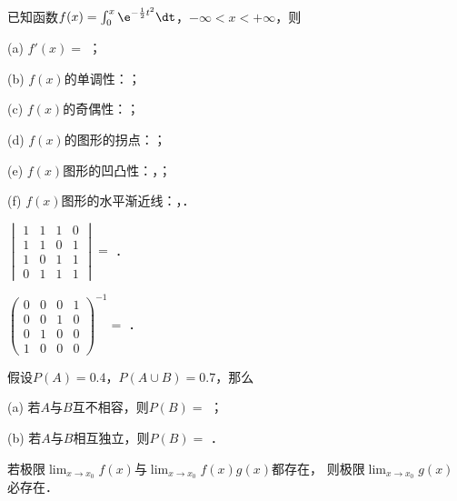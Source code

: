 \documentclass[plain,noanswer,medmath]{../../template/jnuexam}
\begin{document}




\begin{problem}
已知函数$f(x)=\int_0^x\e^{-\frac{1}{2}t^2}\dt$，$-\infty<x<+\infty$，则\par
(a) $f'(x)=$ \fillin{}；\par
(b) $f(x)$的单调性：\fillin{}；\par
(c) $f(x)$的奇偶性：\fillin{}；\par
(d) $f(x)$的图形的拐点：\fillin{}；\par
(e) $f(x)$图形的凹凸性：\fillin{}，\fillin{}；\par
(f) $f(x)$图形的水平渐近线：\fillin{}，\fillin{}．
\end{problem}


\begin{problem}
$\begin{vmatrix}
  1 & 1 & 1 & 0 \\
  1 & 1 & 0 & 1 \\
  1 & 0 & 1 & 1 \\
  0 & 1 & 1 & 1
\end{vmatrix}=$ \fillin{}．
\end{problem}


\begin{problem}
$\begin{pmatrix}
  0 & 0 & 0 & 1 \\
  0 & 0 & 1 & 0 \\
  0 & 1 & 0 & 0 \\
  1 & 0 & 0 & 0
\end{pmatrix}^{-1}=$ \fillin{}．
\end{problem}


\begin{problem}
假设$P(A)=0.4$，$P(A\cup B)=0.7$，那么\par
(a) 若$A$与$B$互不相容，则$P(B)=$ \fillin{}；\par
(b) 若$A$与$B$相互独立，则$P(B)=$ \fillin{}．
\end{problem}



\begin{problem}
若极限$\lim_{x \to x_0} f(x)$与$\lim_{x \to x_0} f(x)g(x)$都存在，
则极限$\lim_{x \to x_0} g(x)$必存在．\tickout{}
\end{problem}
\end{document}
